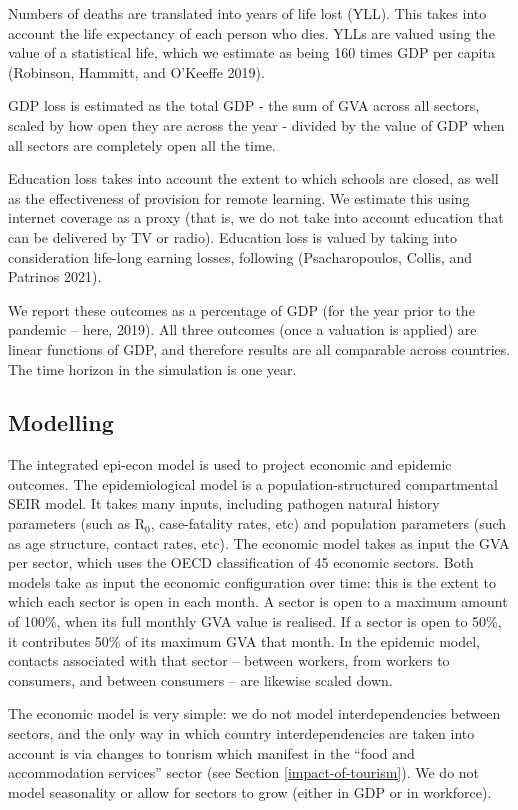 \documentclass[
]{article}
\begin{document}
Numbers of deaths are translated into years of life lost (YLL). This takes into account the life expectancy of each person who dies. YLLs are valued using the value of a statistical life, which we estimate as being 160 times GDP per capita (Robinson, Hammitt, and O'Keeffe 2019).

GDP loss is estimated as the total GDP - the sum of GVA across all sectors, scaled by how open they are across the year - divided by the value of GDP when all sectors are completely open all the time.

Education loss takes into account the extent to which schools are closed, as well as the effectiveness of provision for remote learning. We estimate this using internet coverage as a proxy (that is, we do not take into account education that can be delivered by TV or radio). Education loss is valued by taking into consideration life-long earning losses, following (Psacharopoulos, Collis, and Patrinos 2021).

We report these outcomes as a percentage of GDP (for the year prior to the pandemic -- here, 2019). All three outcomes (once a valuation is applied) are linear functions of GDP, and therefore results are all comparable across countries. The time horizon in the simulation is one year.

\hypertarget{modelling}{%
\subsection{Modelling}\label{modelling}}

The integrated epi-econ model is used to project economic and epidemic outcomes. The epidemiological model is a population-structured compartmental SEIR model. It takes many inputs, including pathogen natural history parameters (such as R\(_0\), case-fatality rates, etc) and population parameters (such as age structure, contact rates, etc). The economic model takes as input the GVA per sector, which uses the OECD classification of 45 economic sectors. Both models take as input the economic configuration over time: this is the extent to which each sector is open in each month. A sector is open to a maximum amount of 100\%, when its full monthly GVA value is realised. If a sector is open to 50\%, it contributes 50\% of its maximum GVA that month. In the epidemic model, contacts associated with that sector -- between workers, from workers to consumers, and between consumers -- are likewise scaled down.

The economic model is very simple: we do not model interdependencies between sectors, and the only way in which country interdependencies are taken into account is via changes to tourism which manifest in the ``food and accommodation services'' sector (see Section \ref{impact-of-tourism}). We do not model seasonality or allow for sectors to grow (either in GDP or in workforce).
\end{document}
